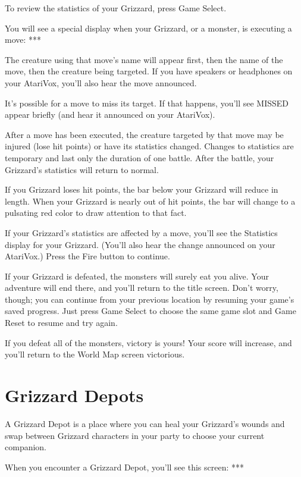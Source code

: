 \documentclass[10pt,twoside,openright]{memoir}
\begin{document}
To review the statistics of your Grizzard, press Game Select.

You will see a special display when your Grizzard, or a monster, is
executing a move: ***

The creature using that move's name will appear first, then the name of the
move, then the creature being targeted. If you have speakers or headphones
on your AtariVox, you'll also hear the move announced.

It's possible for a move to miss its target. If that happens, you'll see
MISSED appear briefly (and hear it announced on your AtariVox).

After a move has been executed, the creature targeted by that move may be
injured (lose hit points) or have its statistics changed. Changes to
statistics are temporary and last only the duration of one battle. After the
battle, your Grizzard's statistics will return to normal.

If you Grizzard loses hit points, the bar below your Grizzard will reduce in
length. When your Grizzard is nearly out of hit points, the bar will change
to a pulsating red color to draw attention to that fact.

If your Grizzard's statistics are affected by a move, you'll see the
Statistics display for your Grizzard. (You'll also hear the change announced
on your AtariVox.) Press the Fire button to continue.

If your Grizzard is defeated, the monsters will surely eat you alive. Your
adventure will end there, and you'll return to the title screen. Don't
worry, though; you can continue from your previous location by resuming your
game's saved progress. Just press Game Select to choose the same game slot
and Game Reset to resume and try again.

If you defeat all of the monsters, victory is yours! Your score will
increase, and you'll return to the World Map screen victorious.





\section{Grizzard Depots}

A Grizzard Depot is a place where you can heal your Grizzard's wounds and
swap between Grizzard characters in your party to choose your current
companion.

When you encounter a Grizzard Depot, you'll see this screen: ***
\end{document}
